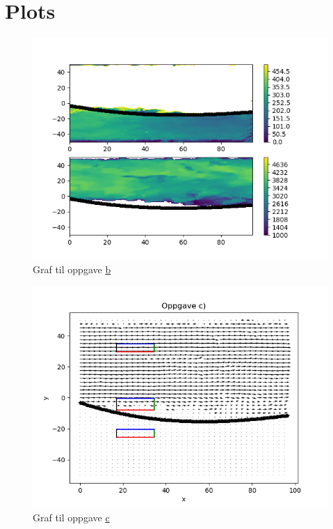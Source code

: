 \documentclass[a4paper,10pt,norsk]{article}
\begin{document}
	\newpage
	\section*{Plots}
	\begin{figure}[h!]
		\centering
		\caption{Graf til oppgave \hyperref[ass:b]{b}}
		\label{fig:b}
		\includegraphics{oppgave_b.png}
	\end{figure}
	\newpage
	\begin{figure}[h!]
		\centering
		\caption{Graf til oppgave \hyperref[ass:c]{c}} 
		\label{fig:c}
		\includegraphics{oppgave_c.png}
	\end{figure}
	\newpage
\end{document}

